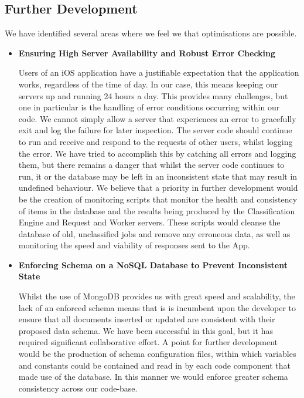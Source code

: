 \documentclass[a4paper,11pt]{article}
\begin{document}
\begin{description}
\subsection{Further Development}
We have identified several areas where we feel we that optimisations are possible.\\

\begin{itemize}
  
 \item \textbf{Ensuring High Server Availability and Robust Error Checking}
 
Users of an iOS application have a justifiable expectation that the application works, regardless of the time of day. In our case, this means keeping our servers up and running 24 hours a day. This provides many challenges, but one in particular is the handling of error conditions occurring within our code. We cannot simply allow a server that experiences an error to gracefully exit and log the failure for later inspection. The server code should continue to run and receive and respond to the requests of other users, whilst logging the error.
We have tried to accomplish this by catching all errors and logging them, but there remains a danger that whilst the server code continues to run, it or the database may be left in an inconsistent state that may result in undefined behaviour.
We believe that a priority in further development would be the creation of monitoring scripts that monitor the health and consistency of items in the database and the results being produced by the Classification Engine and Request and Worker servers. These scripts would cleanse the database of old, unclassified jobs and remove any erroneous data, as well as monitoring the speed and viability of responses sent to the App.\\


\item \textbf{Enforcing Schema on a NoSQL Database to Prevent Inconsistent State}

Whilst the use of MongoDB provides us with great speed and scalability, the lack of an enforced schema means that is is incumbent upon the developer to ensure that all documents inserted or updated are consistent with their proposed data schema. We have been successful in this goal, but it has required significant collaborative effort.
A point for further development would be the production of schema configuration files, within which variables and constants could be contained and read in by each code component that made use of the database. In this manner we would enforce greater schema consistency across our code-base.\\



\end{itemize}
\end{description}
\end{document}
